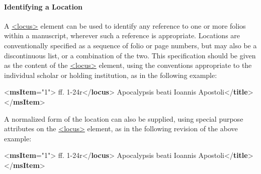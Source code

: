\paragraph[{Identifying a Location}]{Identifying a Location}\par
A \hyperref[TEI.locus]{<locus>} element can be used to identify any reference to one or more folios within a manuscript, wherever such a reference is appropriate. Locations are conventionally specified as a sequence of folio or page numbers, but may also be a discontinuous list, or a combination of the two. This specification should be given as the content of the \hyperref[TEI.locus]{<locus>} element, using the conventions appropriate to the individual scholar or holding institution, as in the following example: \par\bgroup{}\exampleFont \begin{shaded}\noindent\mbox{}{<\textbf{msItem}\hspace*{1em}{n}="{1}">}\mbox{}\newline 
{}ff. 1-24r{</\textbf{locus}>}\mbox{}\newline 
{}Apocalypsis beati Ioannis Apostoli{</\textbf{title}>}\mbox{}\newline 
{</\textbf{msItem}>}\end{shaded}\egroup\par \par
A normalized form of the location can also be supplied, using special purpose attributes on the \hyperref[TEI.locus]{<locus>} element, as in the following revision of the above example: \par\bgroup{}\exampleFont \begin{shaded}\noindent\mbox{}{<\textbf{msItem}\hspace*{1em}{n}="{1}">}\mbox{}\newline 
{}ff. 1-24r{</\textbf{locus}>}\mbox{}\newline 
{}Apocalypsis beati Ioannis Apostoli{</\textbf{title}>}\mbox{}\newline 
{</\textbf{msItem}>}\end{shaded}\egroup\par \par
